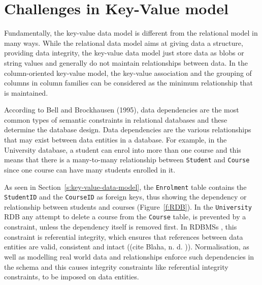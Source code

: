 \section{Challenges in Key-Value model}\label{s:challenges-key-value}
Fundamentally,   the key-value data model is different from the relational model
in many ways.  While the relational data model aims at giving data a structure,  
providing data integrity,   the key-value data model just
store data as \acp{blob} or string values and generally do not maintain
relationships between data.  In the column-oriented key-value model,   the
key-value association and the grouping of columns in column families can be
considered as the minimum relationship that is maintained.  

According to Bell and Brockhausen (1995),   data dependencies are the most
common types of semantic constraints in relational databases and these determine
the database design.  Data dependencies are the various relationships that may
exist between data entities in a database.  For example,   in the
University database,   a student can enrol into more than one course and this
means that there is a many-to-many relationship between \texttt{Student} and
\texttt{Course} since   one course can have many students enrolled in it.  

As seen in Section~\ref{s:key-value-data-model},   the \texttt{Enrolment} table 
contains the \texttt{StudentID} and the \texttt{CourseID} as foreign keys,  
thus showing the dependency or relationship between students and courses
(Figure~\ref{f:RDB}). 
In the \texttt{University} \ac{RDB} any attempt to delete a course
from the \texttt{Course} table,   is prevented by a constraint,   unless the
dependency itself is removed first.  In \acp{RDBMS} ,   this constraint is referential
integrity,   which ensures that references between data entities are valid,  
consistent and intact (\todo(cite Blaha,   n. d. )). 
Normalisation,   as well as modelling real world data and
relationships enforce such dependencies in the schema and this causes integrity
constraints like referential integrity constraints,   to be imposed on data
entities. 

